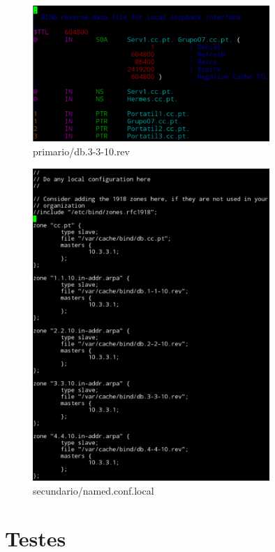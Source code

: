 \documentclass[a4paper]{report}
\begin{document}
\begin{figure}[H]
    \centering 
    \includegraphics[width=0.8\textwidth]{images/dbrev.png}  
    \caption{primario/db.3-3-10.rev}
    \label{fig:dbrev}
\end{figure}

\begin{figure}[H]
    \centering 
    \includegraphics[width=0.8\textwidth]{images/secondary_ncl.png}  
    \caption{secundario/named.conf.local}
    \label{fig:secondary_nncl}
\end{figure}

\section{Testes}
\end{document}
